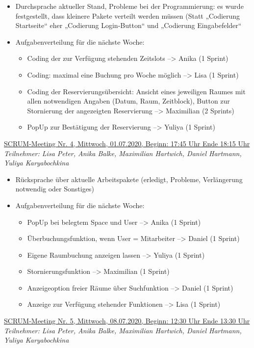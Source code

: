 \documentclass[a4paper,report,headsepline]{scrreprt}
\begin{document}
\begin{itemize}
\item Durchsprache aktueller Stand, Probleme bei der Programmierung: es wurde festgestellt, dass kleinere Pakete verteilt werden müssen (Statt „Codierung Startseite“ eher „Codierung Login-Button“ und „Codierung Eingabefelder“
\item Aufgabenverteilung für die nächste Woche:
\begin{itemize}
\item Coding der zur Verfügung stehenden Zeitslots --> Anika (1 Sprint)
\item Coding: maximal eine Buchung pro Woche möglich --> Lisa (1 Sprint)
\item Coding der Reservierungsübersicht: Ansicht eines jeweiligen Raumes mit allen notwendigen Angaben (Datum, Raum, Zeitblock), Button zur Stornierung der angezeigten Reservierung --> Maximilian (2 Sprints)
\item PopUp zur Bestätigung der Reservierung --> Yuliya (1 Sprint)

\end{itemize}
\end{itemize}
 \underline{{\large SCRUM-Meeting Nr. 4, Mittwoch, 01.07.2020, Beginn: 17:45 Uhr Ende 18:15 Uhr}}  \\
\textit{Teilnehmer: Lisa Peter, Anika Balke, Maximilian Hartwich, Daniel Hartmann, Yuliya Karyabochkina} 

\begin{itemize}
\item Rücksprache über aktuelle Arbeitspakete (erledigt, Probleme, Verlängerung notwendig oder Sonstiges)
\item Aufgabenverteilung für die nächste Woche:
\begin{itemize}
\item PopUp bei belegtem Space und User --> Anika (1 Sprint)
\item Überbuchungsfunktion, wenn User = Mitarbeiter --> Daniel (1 Sprint)
\item Eigene Raumbuchung anzeigen lassen --> Yuliya (1 Sprint)
\item Stornierungsfunktion --> Maximilian (1 Sprint)
\item Anzeigeoption freier Räume über Suchfunktion --> Daniel (1 Sprint)
\item Anzeige zur Verfügung stehender Funktionen --> Lisa (1 Sprint)

\end{itemize}
\end{itemize}
 \underline{{\large SCRUM-Meeting Nr. 5, Mittwoch, 08.07.2020, Beginn: 12:30 Uhr Ende 13:30 Uhr}}  \\
\textit{Teilnehmer: Lisa Peter, Anika Balke, Maximilian Hartwich, Daniel Hartmann, Yuliya Karyabochkina} 
\end{document}
